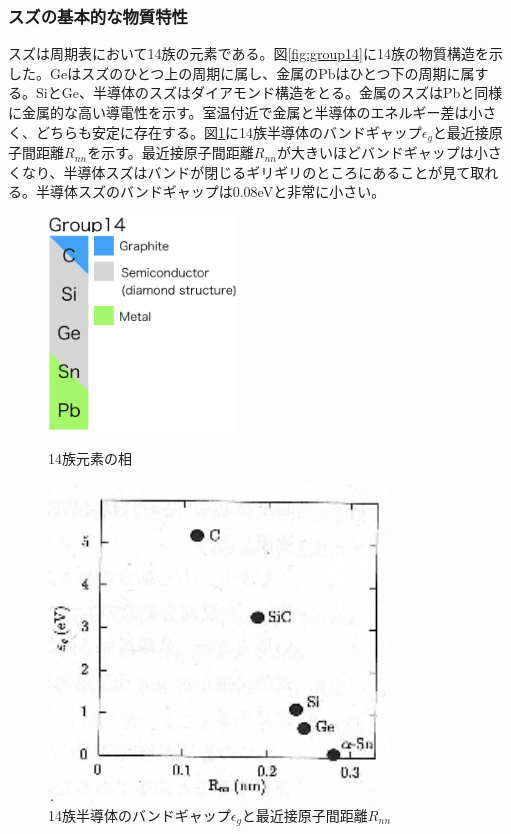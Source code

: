\subsubsection{スズの基本的な物質特性}
スズは周期表において14族の元素である。図\ref{fig:group14}に14族の物質構造を示した。Geはスズのひとつ上の周期に属し、金属のPbはひとつ下の周期に属する。SiとGe、半導体のスズはダイアモンド構造をとる。金属のスズはPbと同様に金属的な高い導電性を示す。室温付近で金属と半導体のエネルギー差は小さく、どちらも安定に存在する。図\ref{fig:bandgaps}に14族半導体のバンドギャップ$\epsilon_g$と最近接原子間距離$R_{nn}$を示す\cite{Yonezawa}。最近接原子間距離$R_{nn}$が大きいほどバンドギャップは小さくなり、半導体スズはバンドが閉じるギリギリのところにあることが見て取れる。半導体スズのバンドギャップは0.08eVと非常に小さい。
\begin{figure}[!h]
 \begin{minipage}{0.4\hsize}
  \begin{center}
   \includegraphics[width=50mm]{Introduction/group14.eps}
  \end{center}
  \caption{14族元素の相}
  \label{fig:group14}
 \end{minipage}
 \begin{minipage}{0.6\hsize}
  \begin{center}
   \includegraphics[width=90mm]{Introduction/bandgaps.eps}
  \end{center}
  \caption{14族半導体のバンドギャップ$\epsilon_g$と最近接原子間距離$R_{nn}$\cite{Yonezawa}}
  \label{fig:bandgaps}
 \end{minipage}
\end{figure}



